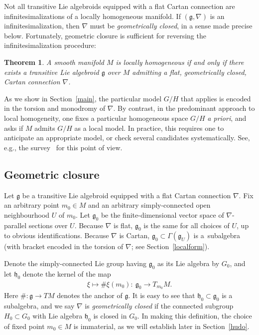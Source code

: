 \documentclass[11pt]{article}
\numberwithin{equation}{section}
\newtheorem{TheoremBlaom}{Theorem}[section]
\begin{document}
Not all transitive Lie algebroids equipped with a f\/lat Cartan
connection are inf\/initesimali\-za\-tions of a locally homogeneous
manifold. If $({\mathfrak g}, \nabla)$ is an inf\/initesimalization,
then $\nabla $ must be {\it geometrically closed}, in a sense made
precise below. Fortunately, geometric closure is suf\/f\/icient for
reversing the inf\/initesimalization procedure:

\begin{TheoremBlaom}\label{TheoremA}
  A smooth manifold $M$ is locally homogeneous if and only if there
  exists a transitive Lie algebroid $\mathfrak g$ over $M$ admitting a
  flat, geometrically closed, Cartan connection $\nabla$.
\end{TheoremBlaom}


As we show in Section~\ref{main}, the particular model $G/H$ that applies is
encoded in the torsion and monodromy of $\nabla$. By contrast, in the
predominant approach to local homogeneity, one f\/ixes a particular
homogeneous space $G/H$ {\em a priori}, and asks if $M$ admits $G/H$
as a local model. In practice, this requires one to anticipate an
appropriate model, or check several candidates systematically. See,
e.g., the survey~\cite{Goldman_10} for this point of view.

\subsection{Geometric closure}\label{geomclose}

Let ${\mathfrak g} $ be a transitive Lie algebroid equipped with a
f\/lat Cartan connection $\nabla$. Fix an arbitrary point $m_0 \in M$
and an arbitrary simply-connected open neighbourhood $U$ of $m_0$. Let
${\mathfrak g}_0$ be the f\/inite-dimensional vector space of $\nabla
$-parallel sections over $U$. Because $\nabla$ is f\/lat, ${\mathfrak
  g}_0$ is the same for all choices of $U$, up to obvious
identif\/ications. Because $\nabla$ is Cartan, ${\mathfrak g}_0 \subset
\Gamma({\mathfrak g}_U)$ is a~subalgebra (with bracket encoded in the
torsion of $\nabla $; see Section~\ref{localform}).

Denote the simply-connected Lie group having ${\mathfrak g}_0 $ as its
Lie algebra by $G_0$, and let ${\mathfrak h}_0$ denote the kernel of
the map
\begin{gather*}
  \xi \mapsto \#\xi (m_0) \colon \  {\mathfrak g}_0 \rightarrow
  T_{m_0}M.
\end{gather*}
Here $\# \colon {\mathfrak g} \rightarrow TM$ denotes the anchor of
$\mathfrak g$. It is easy to see that ${\mathfrak h}_0 \subset
{\mathfrak g}_0$ is a subalgebra, and we say $\nabla $ is {\it
  geometrically closed} if the connected subgroup $H_0 \subset G_0$
with Lie algebra ${\mathfrak h}_0$ is closed in $G_0$. In making this
def\/inition, the choice of f\/ixed point $m_0 \in M$ is immaterial, as we
will establish later in Section~\ref{hudo}.
\end{document}
